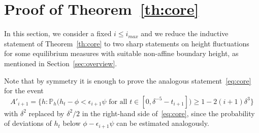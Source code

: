 \documentclass[10pt]{amsart}
\theoremstyle{definition}\newtheorem{defi}[theo]{Definition}\newtheorem{rema}[theo]{Remark}\newtheorem{exam}[theo]{Example}\newtheorem{exem}[theo]{Example}\newtheorem{nota}[theo]{Notation}
\renewcommand{\P}{\mathbb{P}}
\newcommand{\eps}{\epsilon}
\begin{document}
\section{Proof of Theorem~\ref{th:core}}\label{sec:core}

In this section, we consider a fixed $i\le i_{max}$ and we reduce the inductive statement of Theorem~\ref{th:core} to two sharp statements on height fluctuations for some equilibrium measures with suitable non-affine boundary height, as mentioned in Section~\ref{sec:overview}.


Note that by symmetry it is enough to prove the analogous statement~\eqref{eq:core} for the event
\begin{equation}
A'_{i+1}=\Big\{h:\P_h\Big(h_t-\phi<\eps_{i+1}\psi \text{ for all }t\in \left[0,\delta^{-5}-t_{i+1}\right]\Big)\geq 1 -2(i+1)\delta^3 \Big\}
\end{equation}
with $\delta^2$ replaced by $\delta^2/2$ in the right-hand side of~\eqref{eq:core}, since the probability of deviations of $h_t$ below $\phi-\epsilon_{i+1}\psi$ can be estimated analogously.
\end{document}
